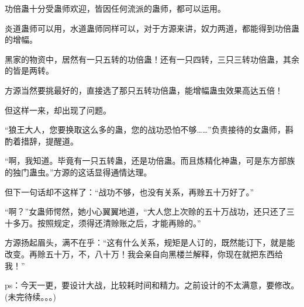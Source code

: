 \begin{this_body}
功倍蛊十分受蛊师欢迎，皆因任何流派的蛊师，都可以运用。

炎道蛊师可以用，水道蛊师同样可以，对于方源来讲，奴力两道，都能得到功倍蛊的增幅。

黑家的物资中，居然有一只五转的功倍蛊！还有一只四转，三只三转功倍蛊，其余的皆是两转。

方源当然要挑最好的，直接选了那只五转功倍蛊，能增幅蛊虫效果高达五倍！

但这样一来，却出现了问题。

“狼王大人，您要换取这么多的蛊，您的战功恐怕不够……”负责接待的女蛊师，斟酌着措辞，提醒道。

“啊，我知道。毕竟有一只五转蛊，还是功倍蛊。而且炼精化神蛊，可是东方部族的独门蛊虫。”方源的这话显得通情达理。

但下一句话却不这样了：“战功不够，也没有关系，再赊五十万好了。”

“啊？”女蛊师愕然，她小心翼翼地道，“大人您上次赊的五十万战功，还只还了三十多万。按照规定，须得还清赊账之后，才能再赊的。”

方源扬起眉头，满不在乎：“这有什么关系，规矩是人订的，既然能订下，就是能改变。再赊五十万，不，八十万！我会亲自向黑楼兰解释，你现在就把东西给我！”

ps：今天一更，要设计大战，比较耗时间和精力。之前设计的不太满意，要修改。(未完待续。。。)

\end{this_body}

